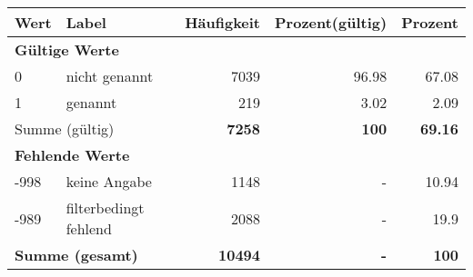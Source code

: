      \begin{longtable}{lXrrr}
     \toprule
     \textbf{Wert} & \textbf{Label} & \textbf{Häufigkeit} & \textbf{Prozent(gültig)} & \textbf{Prozent} \\
     \endhead
     \midrule
     \multicolumn{5}{l}{\textbf{Gültige Werte}}\\

     0 &
     \multicolumn{1}{X}{ nicht genannt   } &


       \num{7039} &
       \num[round-mode=places,round-precision=2]{96.98} &
         \num[round-mode=places,round-precision=2]{67.08} \\

     1 &
     \multicolumn{1}{X}{ genannt   } &


       \num{219} &
       \num[round-mode=places,round-precision=2]{3.02} &
         \num[round-mode=places,round-precision=2]{2.09} \\
     \midrule
     \multicolumn{2}{l}{Summe (gültig)} &
       \textbf{\num{7258}} &
     \textbf{\num{100}} &
       \textbf{\num[round-mode=places,round-precision=2]{69.16}} \\
     \multicolumn{5}{l}{\textbf{Fehlende Werte}}\\
       -998 &
       keine Angabe &
         \num{1148} &
        - &
         \num[round-mode=places,round-precision=2]{10.94} \\
       -989 &
       filterbedingt fehlend &
         \num{2088} &
        - &
         \num[round-mode=places,round-precision=2]{19.9} \\
     \midrule
     \multicolumn{2}{l}{\textbf{Summe (gesamt)}} &
          \textbf{\num{10494}} &
        \textbf{-} &
        \textbf{\num{100}} \\
     \bottomrule
     \end{longtable}
     
